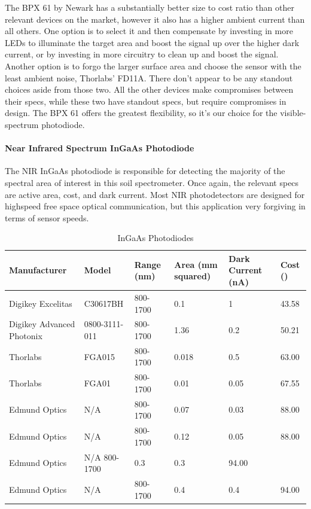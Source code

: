 The BPX 61 by Newark has a substantially better size to cost ratio than other relevant devices on the market, however it also has a higher ambient current than all others. One option is to select it and then compensate by investing in more LEDs to illuminate the target area and boost the signal up over the higher dark current, or by investing in more circuitry to clean up and boost the signal. Another option is to forgo the larger surface area and choose the sensor with the least ambient noise, Thorlabs’ FD11A. There don’t appear to be any standout choices aside from those two. All the other devices make compromises between their specs, while these two have standout specs, but require compromises in design. The BPX 61 offers the greatest flexibility, so it’s our choice for the visible-spectrum photodiode.

\paragraph{Near Infrared Spectrum InGaAs Photodiode}

The NIR InGaAs photodiode is responsible for detecting the majority of the spectral area of interest in this soil spectrometer. Once again, the relevant specs are active area, cost, and dark current. Most NIR photodetectors are designed for highspeed free space optical communication, but this application very forgiving in terms of sensor speeds. 


\begin{table}[H]
	\centering
	\label{table:InGaAsPhotodiodes}
	\caption{InGaAs Photodiodes}
	\begin{tabular}{|l|l|l|l|l|l|}
	\hline
	Manufacturer & Model & Range (nm) & Area (mm squared) & Dark Current (nA) & Cost (\textdollar)\\
	\hline
	Digikey Excelitas & C30617BH & 800-1700 & 0.1 & 1 & 43.58\\
	\hline
	Digikey Advanced Photonix & 0800-3111-011 & 800-1700 & 1.36 & 0.2 & 50.21\\
	\hline
	Thorlabs & FGA015 & 800-1700 & 0.018 & 0.5 & 63.00\\
	\hline
	Thorlabs & FGA01 & 800-1700 & 0.01 & 0.05 & 67.55\\
	\hline
	Edmund Optics & N/A & 800-1700 & 0.07 & 0.03 & 88.00\\
	\hline
	Edmund Optics & N/A & 800-1700 & 0.12 & 0.05 & 88.00\\
	\hline
	Edmund Optics & N/A	800-1700 & 0.3 & 0.3 & 94.00\\
	\hline
	Edmund Optics & N/A & 800-1700 & 0.4 & 0.4 & 94.00\\
	\hline
	\end{tabular}
\end{table}

